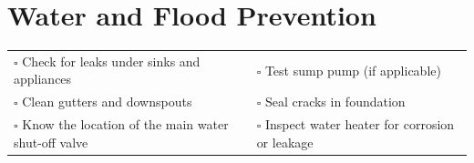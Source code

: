 
\section{Water and Flood Prevention}
\label{sec:water}

\begin{tabular}{p{9cm} p{8cm}}
$\square$ Check for leaks under sinks and appliances & $\square$ Test sump pump (if applicable) \\ 
$\square$ Clean gutters and downspouts & $\square$ Seal cracks in foundation \\ 
$\square$ Know the location of the main water shut-off valve & $\square$ Inspect water heater for corrosion or leakage \\ 
\end{tabular}

